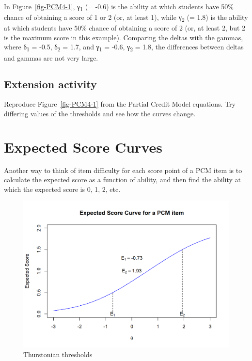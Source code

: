\documentclass[
  letterpaper,
  DIV=11,
  numbers=noendperiod]{scrreprt}
\begin{document}
In Figure~\ref{fig-PCM4-1}, γ\textsubscript{1} (= -0.6) is the ability
at which students have 50\% chance of obtaining a score of 1 or 2 (or,
at least 1), while γ\textsubscript{2} (= 1.8) is the ability at which
students have 50\% chance of obtaining a score of 2 (or, at least 2, but
2 is the maximum score in this example). Comparing the deltas with the
gammas, where δ\textsubscript{1} = -0.5, δ\textsubscript{2} = 1.7, and
γ\textsubscript{1} = -0.6, γ\textsubscript{2} = 1.8, the differences
between deltas and gammas are not very large.

\hypertarget{extension-activity}{%
\section{Extension activity}\label{extension-activity}}

Reproduce Figure~\ref{fig-PCM4-1} from the Partial Credit Model
equations. Try differing values of the thresholds and see how the curves
change.

\hypertarget{expected-score-curves}{%
\chapter{Expected Score Curves}\label{expected-score-curves}}

Another way to think of item difficulty for each score point of a PCM
item is to calculate the expected score as a function of ability, and
then find the ability at which the expected score is 0, 1, 2, etc.

\begin{figure}

{\centering \includegraphics{images/PCM7-1.png}

}

\caption{\label{fig-PCM7-1}Thurstonian thresholds}

\end{figure}
\end{document}
